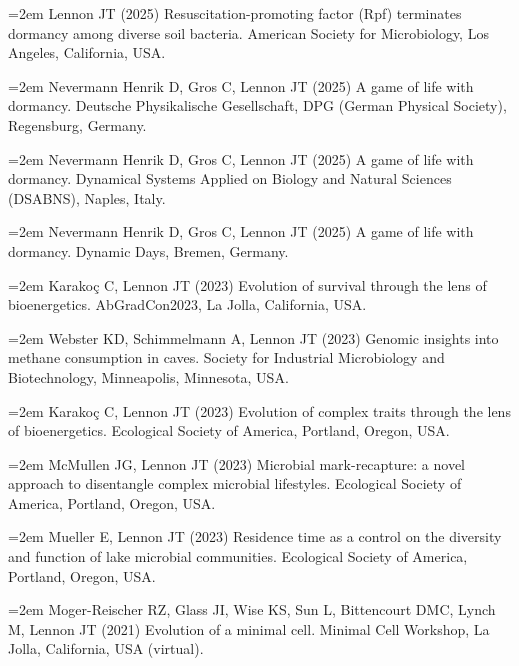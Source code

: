 \documentclass[11pt]{article}
\begin{document}
{\setlength{\parskip}{0.3em}  %

\hangindent=2em Lennon JT (2025) Resuscitation-promoting factor (Rpf) terminates dormancy among diverse soil bacteria. American Society for Microbiology, Los Angeles, California, USA. \par

\hangindent=2em Nevermann Henrik D, Gros C, Lennon JT (2025) A game of life with dormancy. Deutsche Physikalische Gesellschaft, DPG (German Physical Society), Regensburg, Germany. \par

\hangindent=2em Nevermann Henrik D, Gros C, Lennon JT (2025) A game of life with dormancy. Dynamical Systems Applied on Biology and Natural Sciences (DSABNS), Naples, Italy. \par

\hangindent=2em Nevermann Henrik D, Gros C, Lennon JT (2025) A game of life with dormancy. Dynamic Days, Bremen, Germany. \par

\hangindent=2em Karakoç C, Lennon JT (2023) Evolution of survival through the lens of bioenergetics. AbGradCon2023, La Jolla, California, USA. \par

\hangindent=2em Webster KD, Schimmelmann A, Lennon JT (2023) Genomic insights into methane consumption in caves. Society for Industrial Microbiology and Biotechnology, Minneapolis, Minnesota, USA. \par

\hangindent=2em Karakoç C, Lennon JT (2023) Evolution of complex traits through the lens of bioenergetics. Ecological Society of America, Portland, Oregon, USA. \par

\hangindent=2em McMullen JG, Lennon JT (2023) Microbial mark-recapture: a novel approach to disentangle complex microbial lifestyles. Ecological Society of America, Portland, Oregon, USA. \par

\hangindent=2em Mueller E, Lennon JT (2023) Residence time as a control on the diversity and function of lake microbial communities. Ecological Society of America, Portland, Oregon, USA. \par

\hangindent=2em Moger-Reischer RZ, Glass JI, Wise KS, Sun L, Bittencourt DMC, Lynch M, Lennon JT (2021) Evolution of a minimal cell. Minimal Cell Workshop, La Jolla, California, USA (virtual). \par

}
\end{document}
